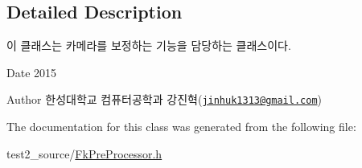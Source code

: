 \subsection{Detailed Description}
이 클래스는 카메라를 보정하는 기능을 담당하는 클래스이다. 

\begin{DoxyDate}{Date}
2015 
\end{DoxyDate}
\begin{DoxyAuthor}{Author}
한성대학교 컴퓨터공학과 강진혁(\href{mailto:jinhuk1313@gmail.com}{\tt jinhuk1313@gmail.\+com}) 
\end{DoxyAuthor}


The documentation for this class was generated from the following file\+:\begin{DoxyCompactItemize}
\item 
test2\+\_\+source/\hyperlink{_fk_pre_processor_8h}{Fk\+Pre\+Processor.\+h}\end{DoxyCompactItemize}
